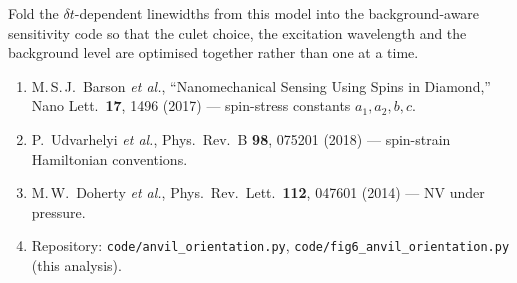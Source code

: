 \documentclass[11pt,a4paper]{ltjsarticle}
\newcommand{\sectionblock}[1]{%
  \par\vspace{2.6mm}%
  \noindent{\large\bfseries\color{scienceblue}#1}\par\nobreak
  \vspace{0.4mm}%
  \noindent{\color{midnightink}\rule{\linewidth}{0.4pt}}\par\nobreak
  \vspace{-1.8mm}%
}
\begin{document}
Fold the $\delta t$-dependent linewidths from this model into the background-aware sensitivity code so that the culet choice, the excitation wavelength and the background level are optimised together rather than one at a time.

\sectionblock{References}

\begin{enumerate}[leftmargin=8mm]
  \item M.\,S.\,J.\ Barson \emph{et al.}, ``Nanomechanical Sensing Using Spins in Diamond,'' Nano Lett.\ \textbf{17}, 1496 (2017) --- spin-stress constants $a_1, a_2, b, c$.
  \item P.\ Udvarhelyi \emph{et al.}, Phys.\ Rev.\ B \textbf{98}, 075201 (2018) --- spin-strain Hamiltonian conventions.
  \item M.\,W.\ Doherty \emph{et al.}, Phys.\ Rev.\ Lett.\ \textbf{112}, 047601 (2014) --- NV under pressure.
  \item Repository: \texttt{code/anvil\_orientation.py}, \texttt{code/fig6\_anvil\_orientation.py} (this analysis).
\end{enumerate}
\end{document}
